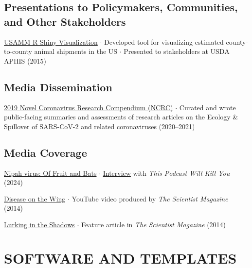 \documentclass{cv}
\begin{document}
\subsection*{Presentations to Policymakers, Communities, and Other Stakeholders}

\href{https://usamm-gen-net.shinyapps.io/usamm-gen-net/}{USAMM R Shiny Visualization} $\cdot$ Developed tool for visualizing estimated county-to-county animal shipments in the US $\cdot$ Presented to stakeholders at USDA APHIS (2015)

\subsection*{Media Dissemination}

\href{https://ncrc.jhsph.edu/}{2019 Novel Coronavirus Research Compendium (NCRC)} $\cdot$ Curated and wrote public-facing summaries and assessments of research articles on the Ecology \& Spillover of SARS-CoV-2 and related coronaviruses (2020--2021)

\subsection*{Media Coverage}

\href{https://thispodcastwillkillyou.com/2024/05/21/episode-140-nipah-virus-of-fruit-and-bats/}{Nipah virus: Of Fruit and Bats} $\cdot$ \href{https://open.spotify.com/episode/3bF2bICaa7Ipq7s6EzCUKj?si=456f659ff8874de5}{Interview} with \textit{This Podcast Will Kill You} (2024)

\href{https://youtu.be/p6I0kRVGyo4}{Disease on the Wing} $\cdot$ YouTube video produced by \textit{The Scientist Magazine} (2014)

\href{https://www.the-scientist.com/features/lurking-in-the-shadows-36302}{Lurking in the Shadows} $\cdot$ Feature article in \textit{The Scientist Magazine} (2014)


\section*{SOFTWARE AND TEMPLATES}

\end{document}
